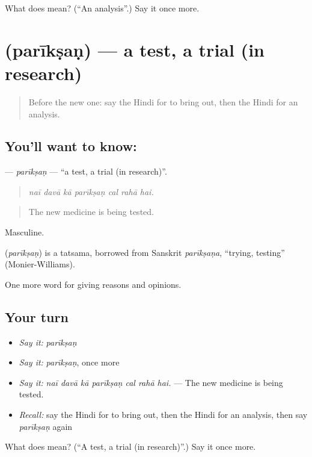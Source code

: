 \begin{tcolorbox}[breakable,colback=teal!4,colframe=teal!35!black,title={Before you move on}]
What does  mean? (\textquotedblleft{}An analysis\textquotedblright{}.) Say it once more.
\end{tcolorbox}
\section[\texorpdfstring{\hi{परीक्षण} (parīkṣaṇ)}{परीक्षण (parīkṣaṇ)}]{ (parīkṣaṇ) — a test, a trial (in research)}

\label{lesson:HI-C362-pariksan}



\begin{quote}
Before the new one: say the Hindi for to bring out, then the Hindi for an analysis.
\end{quote}

\subsection*{You'll want to know: }
\textbf{} — \emph{parīkṣaṇ} — \textquotedblleft{}a test, a trial (in research)\textquotedblright{}.

\begin{quote}
      
\end{quote}

\begin{quote}
\emph{naī davā kā parīkṣaṇ cal rahā hai.}
\end{quote}

\begin{quote}
The new medicine is being tested.
\end{quote}

Masculine.

\begin{cousinweb}
\textbf{} (\emph{parīkṣaṇ}) is a tatsama, borrowed from Sanskrit \emph{parīkṣaṇa}, \textquotedblleft{}trying, testing\textquotedblright{} (Monier-Williams).
\end{cousinweb}

\begin{grammarlens}[title={What you've built}]
One more word for giving reasons and opinions.
\end{grammarlens}

\subsection*{Your turn}
\begin{itemize}
\raggedright
  \item \emph{Say it:} \emph{parīkṣaṇ}
  \item \emph{Say it:} \emph{parīkṣaṇ}, once more
  \item \emph{Say it:} \emph{naī davā kā parīkṣaṇ cal rahā hai.} — The new medicine is being tested.
  \item \emph{Recall:} say the Hindi for to bring out, then the Hindi for an analysis, then say \emph{parīkṣaṇ} again
\end{itemize}

\begin{tcolorbox}[breakable,colback=teal!4,colframe=teal!35!black,title={Before you move on}]
What does  mean? (\textquotedblleft{}A test, a trial (in research)\textquotedblright{}.) Say it once more.
\end{tcolorbox}
